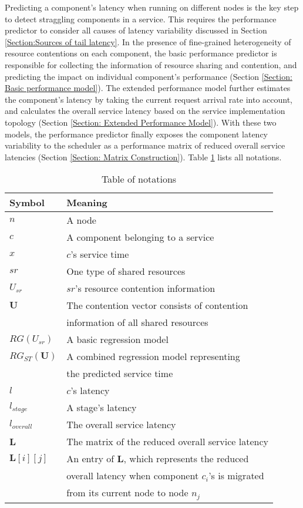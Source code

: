 \documentclass[10pt, conference, compsocconf]{IEEEtran}
\begin{document}
Predicting a component's latency when running on different nodes is the key step to detect straggling components in a service. This requires the performance predictor to consider all causes of latency variability discussed in Section \ref{Section:Sources of tail latency}. In the presence of fine-grained heterogeneity of resource contentions on each component, the basic performance predictor is responsible for collecting the information of resource sharing and contention, and predicting the impact on individual component's performance (Section \ref{Section: Basic performance model}). The extended performance model further estimates the component's latency by taking the current request arrival rate into account, and calculates the overall service latency based on the service implementation topology (Section \ref{Section: Extended Performance Model}). With these two models, the performance predictor finally exposes the component latency variability to the scheduler as a performance matrix of reduced overall service latencies (Section \ref{Section: Matrix Construction}). Table \ref{table: Table of notations} lists all notations.

\begin{table}[h!]
  \caption{Table of notations}
  \centering
  \begin{tabular}{|l|l|}
    \hline
    \textbf{Symbol} & \textbf{Meaning} \\
    \hline
    $n$ & A node \\
    \hline
    $c$ & A component belonging to a service\\
    \hline
    $x$ & $c$'s service time \\
    \hline
    $sr$ & One type of shared resources \\
    \hline
    $U_{sr}$ & $sr$'s resource contention information \\
    \hline
    $\textbf{U}$ & The contention vector consists of contention \\
    &  information of all shared resources\\
    \hline
    $RG(U_{sr})$ & A basic regression model \\
    \hline
    $RG_{ST}(\textbf{U})$ & A combined regression model representing\\
    &the predicted service time\\
    \hline
    $l$ & $c$'s latency \\
\hline
    $l_{stage}$ & A stage's latency \\
    \hline
    $l_{overall}$ & The overall service latency \\
    \hline
    $\textbf{L}$ & The matrix of the reduced overall service latency \\
    \hline
    $\textbf{L}[i][j]$ & An entry of \textbf{L}, which represents the reduced \\
    & overall latency when component $c_{i}$'s is migrated\\
    & from its current node to node $n_{j}$ \\
    \hline
  \end{tabular}
  \label{table: Table of notations}
\end{table}
\end{document}
